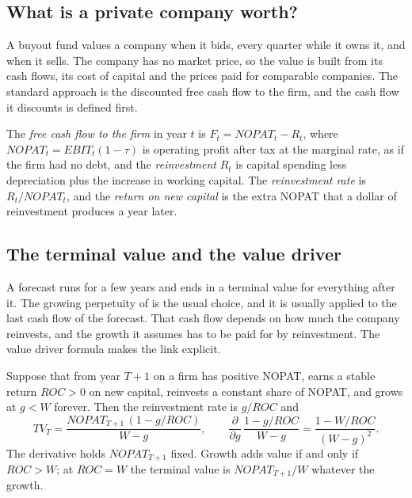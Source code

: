 \begin{chapterrefs}
\FloatBarrier
\section{What is a private company worth?}
\label{sec11:value}

A buyout fund values a company when it bids, every quarter while it owns it, and when it sells. The
company has no market price, so the value is built from its cash flows, its cost of capital and the
prices paid for comparable companies. The standard approach is the discounted free cash flow to the
firm, and the cash flow it discounts is defined first.

\begin{definition}\label{def11:fcff}
The \emph{free cash flow to the firm} in year $t$ is $F_t=\mathit{NOPAT}_t-R_t$, where
$\mathit{NOPAT}_t=\mathit{EBIT}_t(1-\tau)$ is operating profit after tax at the marginal rate, as if the firm
had no debt, and the \emph{reinvestment} $R_t$ is capital spending less depreciation plus the increase in
working capital. The \emph{reinvestment rate} is $R_t/\mathit{NOPAT}_t$, and the \emph{return on new capital}
is the extra NOPAT that a dollar of reinvestment produces a year later.
\end{definition}

\subsection{The terminal value and the value driver}

A forecast runs for a few years and ends in a terminal value for everything after it. The growing
perpetuity of \textcite{gordon1956} is the usual choice, and it is usually applied to the last cash
flow of the forecast. That cash flow depends on how much the company reinvests, and the growth it
assumes has to be paid for by reinvestment. The value driver formula makes the link explicit.

\begin{proposition}\label{prop11:driver}
Suppose that from year $T+1$ on a firm has positive NOPAT, earns a stable return $\mathit{ROC}>0$ on new
capital, reinvests a constant share of NOPAT, and grows at $g<W$ forever. Then the reinvestment rate is $g/\mathit{ROC}$ and
\begin{equation}\label{eq11:driver}
  \mathit{TV}_T=\frac{\mathit{NOPAT}_{T+1}\,(1-g/\mathit{ROC})}{W-g},\qquad
  \frac{\partial}{\partial g}\,\frac{1-g/\mathit{ROC}}{W-g}=\frac{1-W/\mathit{ROC}}{(W-g)^2}.
\end{equation}
The derivative holds $\mathit{NOPAT}_{T+1}$ fixed. Growth adds value if and only if $\mathit{ROC}>W$; at $\mathit{ROC}=W$ the terminal value is
$\mathit{NOPAT}_{T+1}/W$ whatever the growth.
\end{proposition}


\end{chapterrefs}
